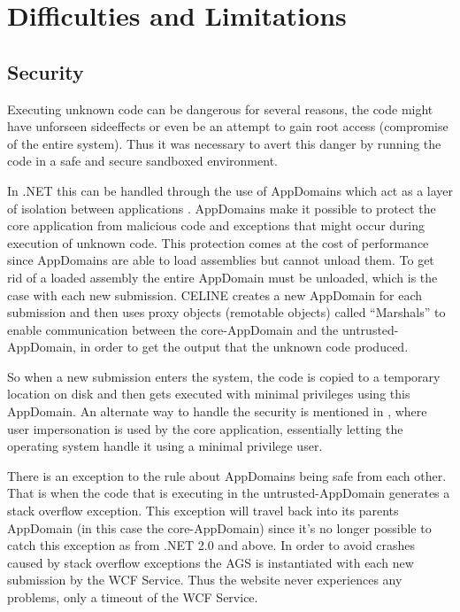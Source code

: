 \section{Difficulties and Limitations}

\subsection{Security} \label{subsec:security}
Executing unknown code can be dangerous for several reasons, the code might have unforseen sideeffects or even be an attempt to gain root access (compromise of the entire system). Thus it was necessary to avert this danger by running the code in a safe and secure sandboxed environment.

In .NET this can be handled through the use of AppDomains which act as a layer of isolation between applications \cite{ApplicationDomains}. AppDomains make it possible to protect the core application from malicious code and exceptions that might occur during execution of unknown code. This protection comes at the cost of performance since AppDomains are able to load assemblies but cannot unload them. To get rid of a loaded assembly the entire AppDomain must be unloaded, which is the case with each new submission. CELINE creates a new AppDomain for each submission and then uses proxy objects (remotable objects) called ``Marshals'' \cite{Marshals} to enable communication between the core-AppDomain and the untrusted-AppDomain, in order to get the output that the unknown code produced. 

So when a new submission enters the system, the code is copied to a temporary location on disk and then gets executed with minimal privileges using this AppDomain. An alternate way to handle the security is mentioned in \cite{Suleman}, where user impersonation is used by the core application, essentially letting the operating system handle it using a minimal privilege user.

There is an exception to the rule about AppDomains being safe from each other. That is when the code that is executing in the untrusted-AppDomain generates a stack overflow exception. This exception will travel back into its parents AppDomain (in this case the core-AppDomain) since it's no longer possible to catch this exception as from .NET 2.0 and above. In order to avoid crashes caused by stack overflow exceptions the AGS is instantiated with each new submission by the WCF Service. Thus the website never experiences any problems, only a timeout of the WCF Service.


